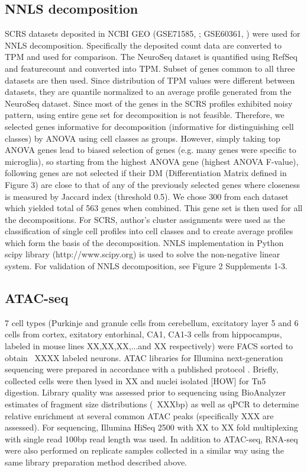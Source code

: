\subsection{NNLS decomposition}
SCRS datasets deposited in NCBI GEO (GSE71585, \cite{Tasic_2016}; GSE60361, \cite{Zeisel_2015}) were used for NNLS decomposition. Specifically the deposited count data are converted to TPM and used for comparison. The NeuroSeq dataset is quantified using RefSeq and featurecount \citep{Liao_2013} and converted into TPM. Subset of genes common to all three datasets are then used. Since distribution of TPM values were different between datasets, they are quantile normalized to an average profile generated from the NeuroSeq dataset. Since most of the genes in the SCRS profiles exhibited noisy pattern, using entire gene set for decomposition is not feasible. Therefore, we selected genes informative for decomposition (informative for distinguishing cell classes) by ANOVA using cell classes as groups. However, simply taking top ANOVA genes lead to biased selection of genes (e.g. many genes were specific to microglia), so starting from the highest ANOVA gene (highest ANOVA F-value), following genes are not selected if their DM (Differentiation Matrix defined in Figure 3) are close to that of any of the previously selected genes where closeness is measured by Jaccard index (threshold 0.5). We chose 300 from each dataset which yielded total of 563 genes when combined. This gene set is then used for all the decompositions. For SCRS, author's cluster assignments were used as the classification of single cell profiles into cell classes and to create average profiles which form the basis of the decomposition. NNLS implementation in Python scipy library (http://www.scipy.org) is used to solve the non-negative linear system. For validation of NNLS decomposition, see Figure 2 Supplements 1-3. 

\subsection{ATAC-seq}
7 cell types (Purkinje and granule cells from cerebellum, excitatory layer 5 and 6 cells from cortex, exitatory entorhinal, CA1, CA1-3 cells from hippocampus, labeled in mouse lines XX,XX,XX,...and XX respectively) were FACS sorted to obtain ~XXXX labeled neurons. ATAC libraries for Illumina next-generation sequencing were prepared in accordance with a published protocol \citep{Buenrostro_2013}. Briefly, collected cells were then lysed in XX and nuclei isolated [HOW] for Tn5 digestion. Library quality was assessed prior to sequencing using BioAnalyzer estimates of fragment size distributions (~XXXbp) as well as qPCR to determine relative enrichment at several common ATAC peaks (specifically XXX are assessed). For sequencing, Illumina HiSeq 2500 with XX to XX fold multiplexing with single read 100bp read length was used. In addition to ATAC-seq, RNA-seq were also performed on replicate samples collected in a similar way using the same library preparation method described above. 

